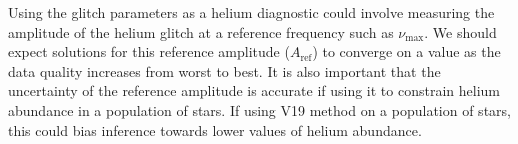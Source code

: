 Using the glitch parameters as a helium diagnostic could involve measuring the amplitude of the helium glitch at a reference frequency such as \(\nu_{\max}\). We should expect solutions for this reference amplitude (\(A_\mathrm{ref}\)) to converge on a value as the data quality increases from worst to best. It is also important that the uncertainty of the reference amplitude is accurate if using it to constrain helium abundance in a population of stars. If using V19 method on a population of stars, this could bias inference towards lower values of helium abundance.

